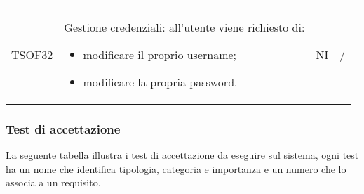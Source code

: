 \begin{center}
\begin{longtable}[!h]{p{60px} p{240px} p{35px} p{35px}}
        TSOF32                           & Gestione credenziali: all'utente viene richiesto di: \begin{itemize} \item modificare il proprio username; \item modificare la propria password.\end{itemize}                                                                                     & NI             & /             \\
    \end{longtable}
\end{center}
\subsubsection{Test di accettazione}
La seguente tabella illustra i test di accettazione da eseguire sul sistema, ogni test ha un nome che identifica tipologia, categoria e importanza e un numero che lo associa a un requisito.

